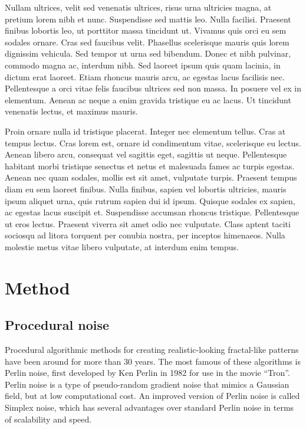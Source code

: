 \documentclass[aps,pre,twocolumn,letterpaper,floatfix,showpacs]{revtex4}
\begin{document}
Nullam ultrices, velit sed venenatis ultrices, risus urna ultricies magna, at pretium lorem nibh et nunc. Suspendisse sed mattis leo. Nulla facilisi. Praesent finibus lobortis leo, ut porttitor massa tincidunt ut. Vivamus quis orci eu sem sodales ornare. Cras sed faucibus velit. Phasellus scelerisque mauris quis lorem dignissim vehicula. Sed tempor ut urna sed bibendum. Donec et nibh pulvinar, commodo magna ac, interdum nibh. Sed laoreet ipsum quis quam lacinia, in dictum erat laoreet. Etiam rhoncus mauris arcu, ac egestas lacus facilisis nec. Pellentesque a orci vitae felis faucibus ultrices sed non massa. In posuere vel ex in elementum. Aenean ac neque a enim gravida tristique eu ac lacus. Ut tincidunt venenatis lectus, et maximus mauris.

Proin ornare nulla id tristique placerat. Integer nec elementum tellus. Cras at tempus lectus. Cras lorem est, ornare id condimentum vitae, scelerisque eu lectus. Aenean libero arcu, consequat vel sagittis eget, sagittis ut neque. Pellentesque habitant morbi tristique senectus et netus et malesuada fames ac turpis egestas. Aenean nec quam sodales, mollis est sit amet, vulputate turpis. Praesent tempus diam eu sem laoreet finibus. Nulla finibus, sapien vel lobortis ultricies, mauris ipsum aliquet urna, quis rutrum sapien dui id ipsum. Quisque sodales ex sapien, ac egestas lacus suscipit et. Suspendisse accumsan rhoncus tristique. Pellentesque ut eros lectus. Praesent viverra sit amet odio nec vulputate. Class aptent taciti sociosqu ad litora torquent per conubia nostra, per inceptos himenaeos. Nulla molestie metus vitae libero vulputate, at interdum enim tempus.

\section{Method}


\subsection{Procedural noise}
\label{sec:perlin}

Procedural algorithmic methods for creating realistic-looking
fractal-like patterns have been around for more than 30 years. The most famous of these
algorithms is Perlin noise, first developed by Ken Perlin in 1982 for
use in the movie ``Tron''.  Perlin noise is a type of pseudo-random
gradient noise that mimics a Gaussian field, but at low computational cost. 
An improved version of Perlin noise is called Simplex
noise, which has several advantages over standard Perlin noise in
terms of scalability and speed.  
\end{document}
